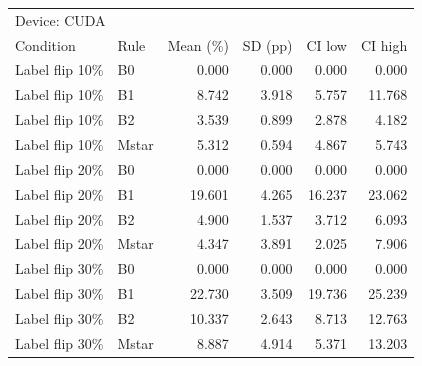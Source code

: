 \begin{tabular}{llrrrr}
\toprule
\multicolumn{6}{l}{Device: CUDA} \\
Condition & Rule & Mean (\%) & SD (pp) & CI low & CI high \\
\midrule
Label flip 10\% & B0 & 0.000 & 0.000 & 0.000 & 0.000 \\
Label flip 10\% & B1 & 8.742 & 3.918 & 5.757 & 11.768 \\
Label flip 10\% & B2 & 3.539 & 0.899 & 2.878 & 4.182 \\
Label flip 10\% & Mstar & 5.312 & 0.594 & 4.867 & 5.743 \\
Label flip 20\% & B0 & 0.000 & 0.000 & 0.000 & 0.000 \\
Label flip 20\% & B1 & 19.601 & 4.265 & 16.237 & 23.062 \\
Label flip 20\% & B2 & 4.900 & 1.537 & 3.712 & 6.093 \\
Label flip 20\% & Mstar & 4.347 & 3.891 & 2.025 & 7.906 \\
Label flip 30\% & B0 & 0.000 & 0.000 & 0.000 & 0.000 \\
Label flip 30\% & B1 & 22.730 & 3.509 & 19.736 & 25.239 \\
Label flip 30\% & B2 & 10.337 & 2.643 & 8.713 & 12.763 \\
Label flip 30\% & Mstar & 8.887 & 4.914 & 5.371 & 13.203 \\
\bottomrule
\end{tabular}
